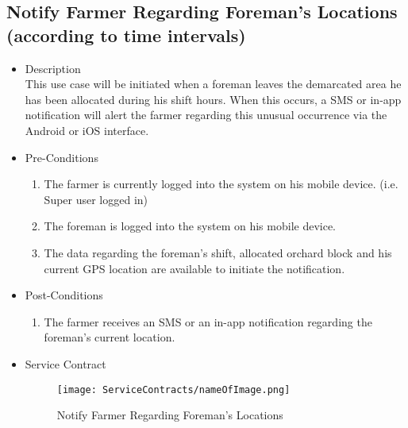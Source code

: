 \documentclass[11pt,fleqn]{book} %
\begin{document}
\subsection{Notify Farmer Regarding Foreman’s Locations (according to time intervals)}
\begin{itemize}
	\item Description\\
	This use case will be initiated when a foreman leaves the demarcated area he has been allocated during his shift hours. When this occurs, a SMS or in-app notification will alert the farmer regarding this unusual occurrence via the Android or iOS interface.
	\item Pre-Conditions
	\begin{enumerate}
		\item The farmer is currently logged into the system on his mobile device. (i.e. Super user logged in)
		\item The foreman is logged into the system on his mobile device.
		\item The data regarding the foreman’s shift, allocated orchard block and his current GPS location are available to initiate the notification.						
	\end{enumerate}
	\item Post-Conditions
	\begin{enumerate}
		\item The farmer receives an SMS or an in-app notification regarding the foreman’s current location.
	\end{enumerate}
	\item Service Contract
	\begin{figure}
		\texttt{[image: ServiceContracts/nameOfImage.png]}
		\caption{Notify Farmer Regarding Foreman’s Locations}
	\end{figure}
\end{itemize}
\end{document}
